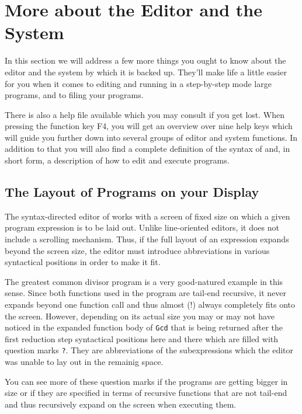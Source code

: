\section{More about the Editor and the \pired System}

In this section we will address a few more things you ought to know
about the \pired editor and the system by which it is backed up. They'll 
make life a little easier
for you when it comes to editing  and running in a step-by-step mode
large programs, and to filing your programs.

There is also a {\mys help file} available which you may consult
if you get lost.
 When pressing the function key F4,
you will get an overview over nine {\mys help keys} which will guide you further down into several groups of editor and system functions. In addition to that
you will also find a complete definition of the syntax of \kir and, in short
  form, a description of how to edit and execute \kir programs.   

\subsection{The Layout of \kir Programs on your Display}

The {\mys syntax-directed editor} of \pired works with a screen of
fixed size on which a given program expression is to be laid out.
Unlike line-oriented editors, it does not include a scrolling
mechanism. Thus, if the full layout of an expression
expands beyond the screen size, the editor must introduce 
abbreviations in various syntactical positions in order to make it fit.

The greatest common divisor program is a very
good-natured example in this sense. Since
both functions used in the program are tail-end recursive, it never 
expands beyond one function call and thus almost (!) always completely
fits onto the screen. However, depending on its actual size you may or may
not have noticed in the expanded function body of {\tt Gcd} that is
being returned after the first reduction step syntactical positions
here and there which are filled with question marks {\tt ?}. They
 are {\mys abbreviations} of the subexpressions which the editor
was unable to lay out in the remainig space.

You can see more of these question marks if the programs are getting
bigger in size or if they are specified in terms of 
recursive functions that are not tail-end and thus recursively expand on 
the screen when executing them. 

